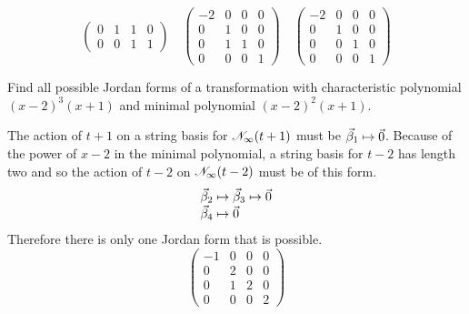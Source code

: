 \begin{exercises}
\begin{answer}
\begin{equation*}
\begin{pmatrix}
          0  &1  &1  &0  \\
          0  &0  &1  &1
       \end{pmatrix}
       \quad
       \begin{pmatrix}
         -2  &0  &0  &0  \\
          0  &1  &0  &0  \\
          0  &1  &1  &0  \\
          0  &0  &0  &1
       \end{pmatrix}
       \quad
       \begin{pmatrix}
         -2  &0  &0  &0  \\
          0  &1  &0  &0  \\
          0  &0  &1  &0  \\
          0  &0  &0  &1
       \end{pmatrix}
     \end{equation*}
    \end{answer}
  \recommended \item
    Find all possible Jordan forms of a transformation with characteristic
    polynomial \( (x-2)^3(x+1) \) and minimal polynomial \( (x-2)^2(x+1) \).
    \begin{answer}
      The action of $t+1$ on a string basis for $\mathscr{N}_\infty(t+1)$
      must be $\vec{\beta}_1\mapsto\vec{0}$. 
      Because of the power of \( x-2 \) in the minimal polynomial, a
      string basis for $t-2$ has length two and so
      the action of \( t-2 \) on \( \mathscr{N}_\infty(t-2) \)
      must be of this form.
      \begin{equation*}
        \begin{array}[t]{l}
          \vec{\beta}_2\mapsto\vec{\beta}_3\mapsto\vec{0}  \\
          \vec{\beta}_4\mapsto\vec{0} 
        \end{array}        
      \end{equation*}
      Therefore there is only one Jordan form that is possible.
      \begin{equation*}
          \begin{pmatrix}
            -1  &0  &0  &0  \\
             0  &2  &0  &0  \\
             0  &1  &2  &0  \\
             0  &0  &0  &2
          \end{pmatrix}
       \end{equation*}
     \end{answer}

\end{exercises}
